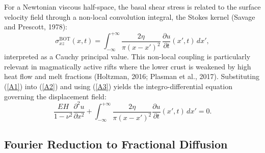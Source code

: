 \documentclass{article}
\begin{document}
For a Newtonian viscous half-space, the basal shear stress is related to the
surface velocity field through a non-local convolution integral, the Stokes
kernel (Savage and Prescott, 1978):
\begin{equation}
\sigma_{xz}^{\text{BOT}}(x,t) =
  \int_{-\infty}^{+\infty}\frac{2\eta}{\pi(x-x')^2}\,
  \frac{\partial u}{\partial t}(x',t)\,dx',
\label{A3}
\end{equation}
interpreted as a Cauchy principal value. This non-local coupling is
particularly relevant in magmatically active rifts where the lower crust is
weakened by high heat flow and melt fractions (Holtzman, 2016; Plasman et al.,
2017). Substituting (\ref{A1}) into (\ref{A2}) and using (\ref{A3}) yields the
integro-differential equation governing the displacement field:
\begin{equation}
\frac{EH}{1-\nu^2}\frac{\partial^2 u}{\partial x^2}
+ \int_{-\infty}^{+\infty}\frac{2\eta}{\pi(x-x')^2}
  \frac{\partial u}{\partial t}(x',t)\,dx' = 0.
\label{A4}
\end{equation}

\subsection{Fourier Reduction to Fractional Diffusion}
\end{document}
